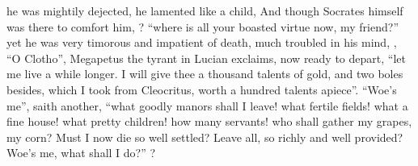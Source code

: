 he was mightily dejected,  he lamented like a child, \etc{} And though
Socrates himself was there to comfort him, ? \enquote{where is all your boasted virtue now, my friend?} yet he was very
timorous and impatient of death, much troubled in his mind, , \etc{} \enquote{O Clotho}, Megapetus the tyrant in Lucian exclaims,
now ready to depart, \enquote{let me live a while longer. I will
give thee a thousand talents of gold, and two boles besides, which I took from
Cleocritus, worth a hundred talents apiece}. \enquote{Woe's me},
saith another, \enquote{what goodly manors shall I leave! what
fertile fields! what a fine house! what pretty children! how many servants! who
shall gather my grapes, my corn? Must I now die so well settled? Leave all, so
richly and well provided? Woe's me, what shall I do?}
?

